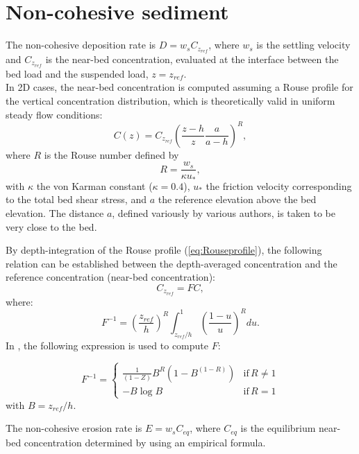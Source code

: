\section{Non-cohesive sediment}\label{sec:ExcNCOH}

The non-cohesive deposition rate is $D = w_s C_{z_{ref}}$, where $w_s$ is the settling velocity and $C_{z_{ref}}$ is the near-bed concentration, evaluated at the interface between the bed load
and the suspended load, $z=z_{ref}$.\\

In 2D cases, the near-bed concentration is computed assuming a Rouse profile for the vertical concentration distribution,
which is theoretically valid in uniform steady flow conditions:
\begin{equation}\label{eq:Rouseprofile}
C(z)=C_{z_{ref}}\left(\frac{z-h}{z}\frac{a}{a-h}\right)^R,
\end{equation}
where $R$ is the Rouse number defined by
\begin{equation}\label{eq:R}
R=\frac{w_s}{\kappa u_*},
\end{equation}
with $\kappa$ the von Karman constant ($\kappa = 0.4$), $u_*$ the
friction velocity corresponding to the total bed shear stress, and $a$ the reference elevation above the bed elevation. The distance $a$, defined variously by
various authors, is taken to be very close to the bed.

By depth-integration of the Rouse profile (\ref{eq:Rouseprofile}), the following relation
can be established between the depth-averaged concentration and the reference concentration (near-bed concentration):
\begin{equation*}
  C_{z_{ref}} = F C,
\end{equation*}
where:
\begin{equation}\label{eq:Rouseprofile}
F^{-1} = \left(\frac{z_{ref}}{h}\right)^R\int_{z_{ref}/h}^1\left(\frac{1-u}{u}\right)^R du.
\end{equation}
In \gaia{}, the following expression is used to compute $F$:

\begin{equation*}
F^{-1}=\left\{\begin{array}{ll}
\frac{1}{\left(1-Z\right)} B^R\left( 1-B^{(1-R)} \right) & \text{if}\,R \neq 1\\
-B \log B &  \text{if}\,R = 1
\end{array}
\right.
\end{equation*}
with $B = z_{ref}/h$.

The non-cohesive erosion rate is $E = w_s C_{eq}$, where $C_{eq}$ is the equilibrium near-bed concentration determined by using an empirical formula.

